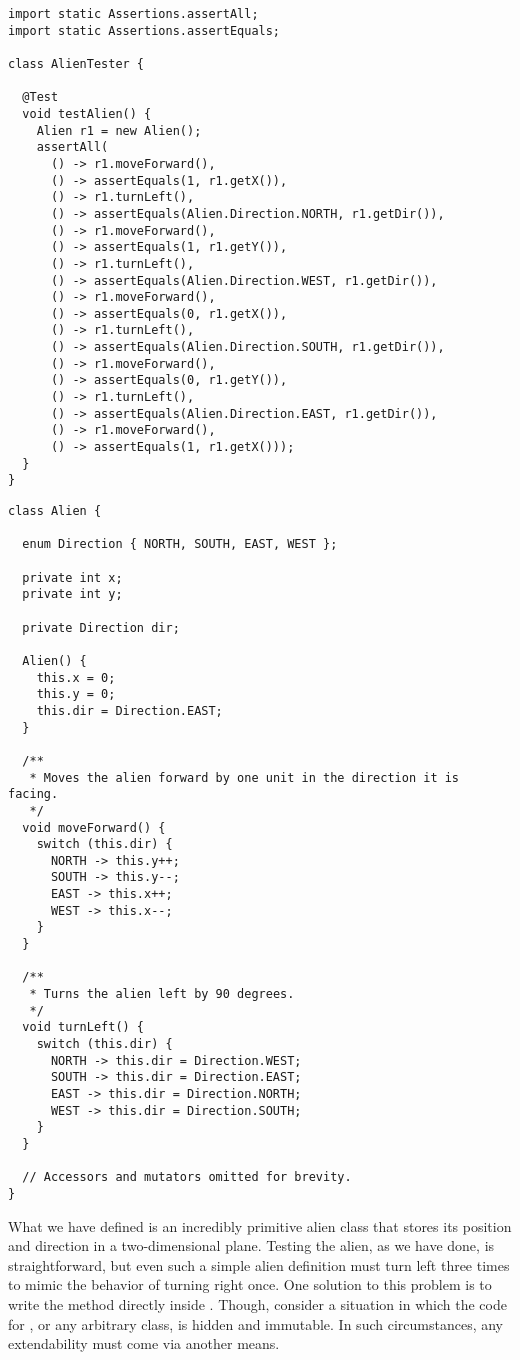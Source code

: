 \begin{lstlisting}[language=MyJava]
import static Assertions.assertAll;
import static Assertions.assertEquals;

class AlienTester {

  @Test
  void testAlien() {
    Alien r1 = new Alien();
    assertAll(
      () -> r1.moveForward(),
      () -> assertEquals(1, r1.getX()),
      () -> r1.turnLeft(),
      () -> assertEquals(Alien.Direction.NORTH, r1.getDir()),
      () -> r1.moveForward(),
      () -> assertEquals(1, r1.getY()),
      () -> r1.turnLeft(),
      () -> assertEquals(Alien.Direction.WEST, r1.getDir()),
      () -> r1.moveForward(),
      () -> assertEquals(0, r1.getX()),
      () -> r1.turnLeft(),
      () -> assertEquals(Alien.Direction.SOUTH, r1.getDir()),
      () -> r1.moveForward(),
      () -> assertEquals(0, r1.getY()),
      () -> r1.turnLeft(),
      () -> assertEquals(Alien.Direction.EAST, r1.getDir()),
      () -> r1.moveForward(),
      () -> assertEquals(1, r1.getX()));
  }
}
\end{lstlisting}

\enlargethispage{2\baselineskip}
\begin{lstlisting}[language=MyJava]
class Alien {

  enum Direction { NORTH, SOUTH, EAST, WEST };

  private int x;
  private int y;

  private Direction dir;

  Alien() {
    this.x = 0;
    this.y = 0;
    this.dir = Direction.EAST;
  }

  /**
   * Moves the alien forward by one unit in the direction it is facing.
   */
  void moveForward() {
    switch (this.dir) {
      NORTH -> this.y++;
      SOUTH -> this.y--;
      EAST -> this.x++;
      WEST -> this.x--;
    }
  }

  /**
   * Turns the alien left by 90 degrees.
   */
  void turnLeft() {
    switch (this.dir) {
      NORTH -> this.dir = Direction.WEST;
      SOUTH -> this.dir = Direction.EAST;
      EAST -> this.dir = Direction.NORTH;
      WEST -> this.dir = Direction.SOUTH;
    }
  }

  // Accessors and mutators omitted for brevity.
}
\end{lstlisting}

What we have defined is an incredibly primitive alien class that stores its position and direction in a two-dimensional plane. Testing the alien, as we have done, is straightforward, but even such a simple alien definition must turn left three times to mimic the behavior of turning right once. One solution to this problem is to write the  method directly inside . Though, consider a situation in which the code for , or any arbitrary class, is hidden and immutable. In such circumstances, any extendability must come via another means. 

